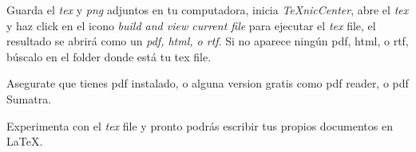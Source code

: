 \documentclass[letterpaper,11pt]{article}
\begin{document}
Guarda el \textit{tex} y \textit{png} adjuntos en tu computadora, inicia \textit{TeXnicCenter}, abre el 
\textit{tex} y haz click en el icono \textit{build and view current file} para ejecutar el \textit{tex} 
file, el resultado se abrir\'a como un \textit{pdf, html, o rtf}.
Si no aparece ning\'un pdf, html, o rtf, b\'uscalo en el folder donde est\'a tu tex file.

Asegurate que tienes pdf instalado, o alguna version gratis como pdf reader, o pdf Sumatra.

Experimenta con el \textit{tex} file y pronto podr\'as escribir tus propios documentos en \LaTeX.

\end{document}
